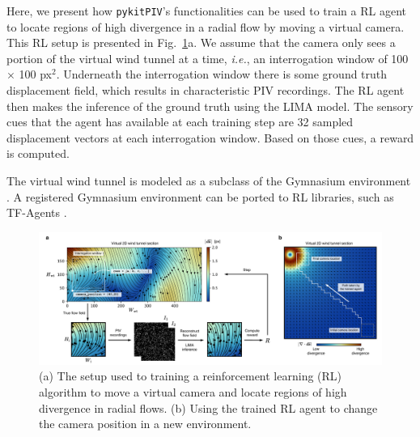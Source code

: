 \documentclass[a4paper,fleqn]{cas-dc}
\begin{document}
Here, we present how \texttt{pykitPIV}'s functionalities can be used to train a RL agent to locate regions of high divergence in a radial flow by moving a virtual camera. This RL setup is presented in Fig.~\ref{fig:RL}a. We assume that the camera only sees a portion of the virtual wind tunnel at a time, \textit{i.e.}, an interrogation window of 100 $\times$ 100 px$^2$. Underneath the interrogation window there is some ground truth displacement field, which results in characteristic PIV recordings. The RL agent then makes the inference of the ground truth using the LIMA model. The sensory cues that the agent has available at each training step are 32 sampled displacement vectors at each interrogation window. Based on those cues, a reward is computed.

The virtual wind tunnel is modeled as a subclass of the Gymnasium environment \cite{brockman2016openai}. A registered Gymnasium environment can be ported to RL libraries, such as TF-Agents \cite{TFAgents}. 

\begin{figure}[t]
\centering
\vspace{-0.4 in}
\includegraphics[width=\textwidth]{RL.pdf}
\vspace{10 pt}
\caption{\footnotesize (a) The setup used to training a reinforcement learning (RL) algorithm to move a virtual camera and locate regions of high divergence in radial flows. (b) Using the trained RL agent to change the camera position in a new environment.}
\label{fig:RL}
\end{figure}
\end{document}
